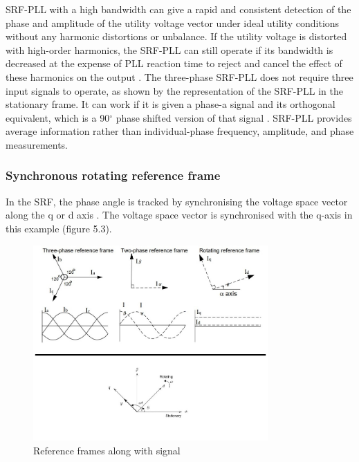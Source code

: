\documentclass[a4paper,12pt]{iitmdiss}
\begin{document}
SRF-PLL with a high bandwidth can give a rapid and consistent detection of the phase and amplitude of the utility voltage vector under ideal utility conditions without any harmonic distortions or unbalance. If the utility voltage is distorted with high-order harmonics, the SRF-PLL can still operate if its bandwidth is decreased at the expense of PLL reaction time to reject and cancel the effect of these harmonics on the output \cite{guo2011phase}.
The three-phase SRF-PLL does not require three input signals to operate, as shown by the representation of the SRF-PLL in the stationary frame. It can work if it is given a phase-a signal and its orthogonal equivalent, which is a 90$^{\circ}$ phase shifted version of that signal \cite{silva2004performance}.
SRF-PLL provides average information rather than individual-phase frequency, amplitude, and phase measurements. 


\subsubsection{ Synchronous rotating reference frame}

In the SRF, the phase angle is tracked by synchronising the voltage space vector along the q or d axis \cite{ghoshal2007method}. The voltage space vector is synchronised with the q-axis in this example (figure 5.3).

\begin{figure} 
    \centering
    \notag
    \includegraphics[width=0.8\textwidth]{reference frames_.jpg}
    \caption{Reference frames along with signal}
    \label{Reference frames along with signal}
\end{figure}
\end{document}
